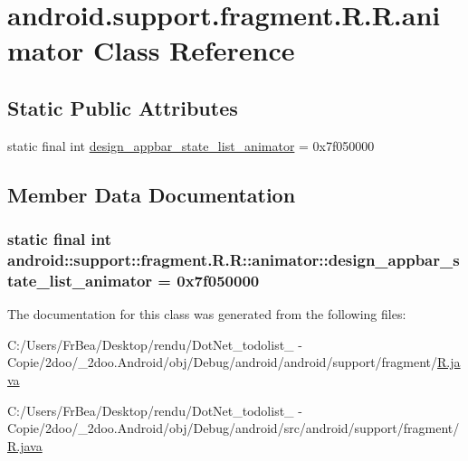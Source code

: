\hypertarget{classandroid_1_1support_1_1fragment_1_1_r_1_1animator}{
\section{android.support.fragment.R.R.animator Class Reference}
\label{classandroid_1_1support_1_1fragment_1_1_r_1_1animator}
}
\subsection*{Static Public Attributes}
\begin{CompactItemize}
\item 
static final int \hyperlink{classandroid_1_1support_1_1fragment_1_1_r_1_1animator_356eb9f8912ec47cacbc2c5e2334eb34}{design\_\-appbar\_\-state\_\-list\_\-animator} = 0x7f050000
\end{CompactItemize}


\subsection{Member Data Documentation}
\hypertarget{classandroid_1_1support_1_1fragment_1_1_r_1_1animator_356eb9f8912ec47cacbc2c5e2334eb34}{
\subsubsection[{design\_\-appbar\_\-state\_\-list\_\-animator}]{\setlength{\rightskip}{0pt plus 5cm}static final int android::support::fragment.R.R::animator::design\_\-appbar\_\-state\_\-list\_\-animator = 0x7f050000}}
\label{classandroid_1_1support_1_1fragment_1_1_r_1_1animator_356eb9f8912ec47cacbc2c5e2334eb34}




The documentation for this class was generated from the following files:\begin{CompactItemize}
\item 
C:/Users/FrBea/Desktop/rendu/DotNet\_\-todolist\_ - Copie/2doo/\_\-2doo.Android/obj/Debug/android/android/support/fragment/\hyperlink{android_2support_2fragment_2_r_8java}{R.java}\item 
C:/Users/FrBea/Desktop/rendu/DotNet\_\-todolist\_ - Copie/2doo/\_\-2doo.Android/obj/Debug/android/src/android/support/fragment/\hyperlink{src_2android_2support_2fragment_2_r_8java}{R.java}\end{CompactItemize}
